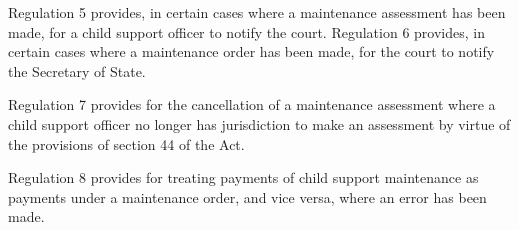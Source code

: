\documentclass[12pt,a4paper]{article}
\begin{document}
  Regulation 5 provides, in certain cases where a maintenance assessment has been made, for a child support officer to notify the court. Regulation 6 provides, in certain cases where a maintenance order has been made, for the court to notify the Secretary of State.

  Regulation 7 provides for the cancellation of a maintenance assessment where a child support officer no longer has jurisdiction to make an assessment by virtue of the provisions of section 44 of the Act.

  Regulation 8 provides for treating payments of child support maintenance as payments under a maintenance order, and vice versa, where an error has been made.
\end{document}
